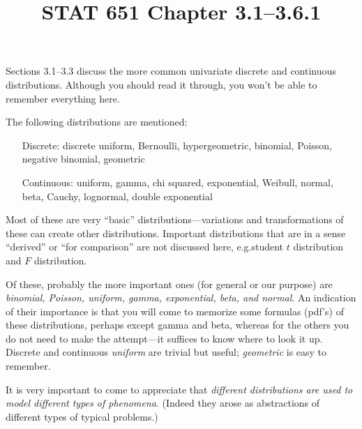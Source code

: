 \documentclass[12pt]{article}
\title{STAT 651 Chapter 3.1--3.6.1}
\begin{document}
\maketitle

Sections 3.1--3.3 discuss the more common univariate discrete and continuous
distributions.
Although you should read it through,
you won't be able to remember everything here.

The following distributions are mentioned:
\begin{itemize}
\item[Discrete:]
discrete uniform, Bernoulli, hypergeometric, binomial, Poisson,
negative binomial, geometric
\item[Continuous:]
uniform, gamma, chi squared, exponential,
Weibull, normal, beta, Cauchy, lognormal, double exponential
\end{itemize}

Most of these are very ``basic'' distributions---variations and
transformations of these can create other distributions.
Important distributions that are in a sense ``derived'' or ``for
comparison'' are not discussed here, e.g.\@ student $t$ distribution
and $F$ distribution.

Of these, probably the more important ones (for general or our purpose)
are \emph{binomial, Poisson, uniform, gamma, exponential, beta, and normal}.
An indication of their importance is that you will come to memorize
some formulas (pdf's) of these distributions, perhaps except gamma and
beta, whereas for the others you do not need to make the attempt---it
suffices to know where to look it up.
Discrete and continuous \emph{uniform} are trivial but useful;
\emph{geometric} is easy to remember.

It is very important to come to appreciate that \emph{different distributions
are used to model different types of phenomena}.
(Indeed they arose as abstractions of different types of typical
problems.)
\end{document}
